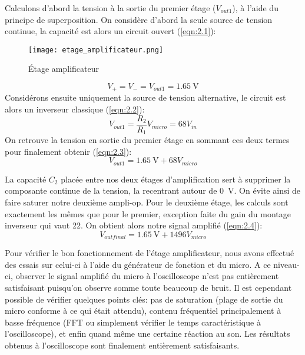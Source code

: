 Calculons d'abord la tension à la sortie du premier étage ($V_{out 1}$), à l'aide du principe de superposition. On considère d'abord la seule source de tension continue, la capacité est alors un circuit ouvert (\ref{eqn:2.1}):
\begin{figure}[htbp]
\centering
\texttt{[image: etage\_amplificateur.png]}
\caption{Étage amplificateur}
\label{fig:etage amplificateur}
\end{figure}
\begin{equation}
V_{+} = V_{-} = V_{out 1} = \SI{1.65}{\volt}
\label{eqn:2.1}
\end{equation}
Considérons ensuite uniquement la source de tension alternative, le circuit est alors un inverseur classique (\ref{eqn:2.2}):
\begin{equation}
V_{out 1} = \frac{R_2}{R_1} V_{micro} = 68 V_{in}
\label{eqn:2.2}
\end{equation}
On retrouve la tension en sortie du premier étage en sommant ces deux termes pour finalement obtenir (\ref{eqn:2.3}):
\begin{equation}
V_{out 1} = \SI{1.65}{\volt} + 68 V_{micro}
\label{eqn:2.3}
\end{equation}

La capacité $C_{2}$ placée entre nos deux étages d'amplification sert à supprimer la composante continue de la tension, la recentrant autour de \SI{0}{\volt}. On évite ainsi de faire saturer notre deuxième ampli-op. Pour le deuxième étage, les calculs sont exactement les mêmes que pour le premier, exception faite du gain du montage inverseur qui vaut 22. On obtient alors notre signal amplifié (\ref{eqn:2.4}):
\begin{equation}
V_{out final} = \SI{1.65}{\volt} + 1496 V_{micro}
\label{eqn:2.4}
\end{equation}

Pour vérifier le bon fonctionnement de l'étage amplificateur, nous avons effectué des essais sur celui-ci à l'aide du générateur de fonction et du micro. A ce niveau-ci, observer le signal amplifié du micro à l'oscilloscope n'est pas entièrement satisfaisant puisqu'on observe somme toute beaucoup de bruit. Il est cependant possible de vérifier quelques points clés: pas de saturation (plage de sortie du micro conforme à ce qui était attendu), contenu fréquentiel principalement à basse fréquence (FFT ou simplement vérifier le temps caractéristique à l'oscilloscope), et enfin quand même une certaine réaction au son. Les résultats obtenus à l'oscilloscope sont finalement entièrement satisfaisants.

